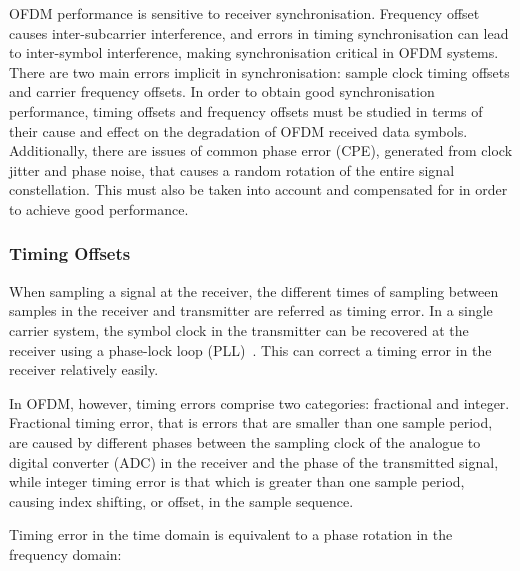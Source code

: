 OFDM performance is sensitive to receiver synchronisation.
Frequency offset causes inter-subcarrier interference, and errors in timing synchronisation can lead to inter-symbol interference, making synchronisation critical in OFDM systems.
There are two main errors implicit in synchronisation: sample clock timing offsets and carrier frequency offsets.
In order to obtain good synchronisation performance, timing offsets and frequency offsets must be studied in terms of their cause and effect on the degradation of OFDM received data symbols.
Additionally, there are issues of common phase error (CPE), generated from clock jitter and phase noise, that causes a random rotation of the entire signal constellation.
This must also be taken into account and compensated for in order to achieve good performance.

\subsubsection{Timing Offsets}

When sampling a signal at the receiver, the different times of sampling between samples in the receiver and transmitter are referred as timing error.
In a single carrier system, the symbol clock in the transmitter can be recovered at the receiver using a phase-lock loop (PLL)~\cite{farhang2008signal}.
This can correct a timing error in the receiver relatively easily.

In OFDM, however, timing errors comprise two categories: fractional and integer.
Fractional timing error, that is errors that are smaller than one sample period, are caused by different phases between the sampling clock of the analogue to digital converter (ADC) in the receiver and the phase of the transmitted signal, while integer timing error is that which is greater than one sample period, causing index shifting, or offset, in the sample sequence.

Timing error in the time domain is equivalent to a phase rotation in the frequency domain:

